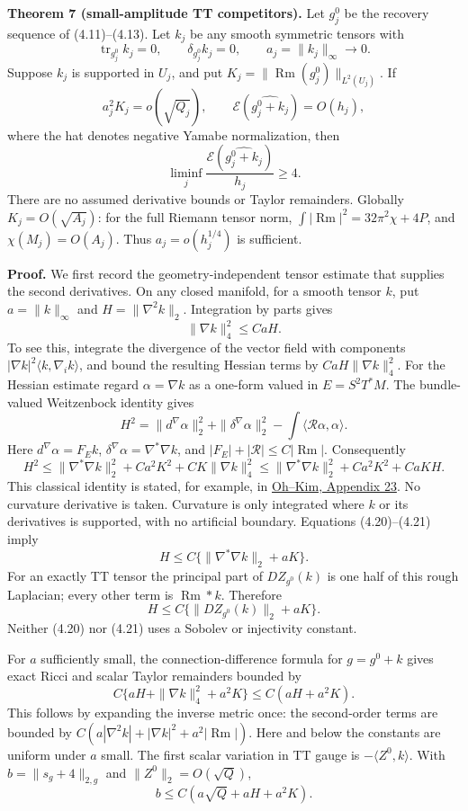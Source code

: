 \documentclass[
  10pt,
]{article}
\begin{document}
\textbf{Theorem 7 (small-amplitude TT competitors).} Let \(g_j^0\) be
the recovery sequence of (4.11)--(4.13). Let \(k_j\) be any smooth
symmetric tensors with \[
 \operatorname{tr}_{g_j^0}k_j=0,\qquad
 \delta_{g_j^0}k_j=0,\qquad a_j=\|k_j\|_\infty\longrightarrow0.
\] Suppose \(k_j\) is supported in \(U_j\), and put
\(K_j=\|\operatorname{Rm}(g_j^0)\|_{L^2(U_j)}\). If \[
 a_j^2 K_j=o(\sqrt{Q_j}),\qquad
 \mathcal E(\widehat{g_j^0+k_j})=O(h_j),
 \tag{4.18}
\] where the hat denotes negative Yamabe normalization, then \[
 \boxed{\liminf_j
     \frac{\mathcal E(\widehat{g_j^0+k_j})}{h_j}\ge4.} \tag{4.19}
\] There are no assumed derivative bounds or Taylor remainders. Globally
\(K_j=O(\sqrt{A_j})\): for the full Riemann tensor norm,
\(\int|\operatorname{Rm}|^2=32\pi^2\chi+4P\), and \(\chi(M_j)=O(A_j)\).
Thus \(a_j=o(h_j^{1/4})\) is sufficient.

\textbf{Proof.} We first record the geometry-independent tensor estimate
that supplies the second derivatives. On any closed manifold, for a
smooth tensor \(k\), put \(a=\|k\|_\infty\) and \(H=\|\nabla^2k\|_2\).
Integration by parts gives \[
 \|\nabla k\|_4^2\le CaH. \tag{4.20}
\] To see this, integrate the divergence of the vector field with
components \(|\nabla k|^2\langle k,\nabla_i k\rangle\), and bound the
resulting Hessian terms by \(CaH\|\nabla k\|_4^2\). For the Hessian
estimate regard \(\alpha=\nabla k\) as a one-form valued in
\(E=S^2T^*M\). The bundle-valued Weitzenbock identity gives \[
 H^2=\|d^\nabla\alpha\|_2^2+
        \|\delta^\nabla\alpha\|_2^2
                -\int\langle\mathcal R\alpha,\alpha\rangle.
\] Here \(d^\nabla\alpha=F_Ek\),
\(\delta^\nabla\alpha=\nabla^*\nabla k\), and
\(|F_E|+|\mathcal R|\le C|\operatorname{Rm}|\). Consequently \[
 H^2\le\|\nabla^*\nabla k\|_2^2+Ca^2K^2
            +CK\|\nabla k\|_4^2
       \le\|\nabla^*\nabla k\|_2^2+Ca^2K^2+CaKH.
 \tag{4.21}
\] This classical identity is stated, for example, in
\href{https://www.matrix-inst.org.au/wp_Matrix2016/wp-content/uploads/2023/07/OhKim.pdf}{Oh--Kim,
Appendix 23}. No curvature derivative is taken. Curvature is only
integrated where \(k\) or its derivatives is supported, with no
artificial boundary. Equations (4.20)--(4.21) imply \[
 H\le C\{\|\nabla^*\nabla k\|_2+aK\}.
\] For an exactly TT tensor the principal part of \(DZ_{g^0}(k)\) is one
half of this rough Laplacian; every other term is
\(\operatorname{Rm}*k\). Therefore \[
 H\le C\{\|DZ_{g^0}(k)\|_2+aK\}. \tag{4.22}
\] Neither (4.20) nor (4.21) uses a Sobolev or injectivity constant.

For \(a\) sufficiently small, the connection-difference formula for
\(g=g^0+k\) gives exact Ricci and scalar Taylor remainders bounded by \[
 C\{aH+\|\nabla k\|_4^2+a^2K\}
 \le C(aH+a^2K). \tag{4.23}
\] This follows by expanding the inverse metric once: the second-order
terms are bounded by
\(C(a|\nabla^2k|+|\nabla k|^2+a^2|\operatorname{Rm}|)\). Here and below
the constants are uniform under \(a\) small. The first scalar variation
in TT gauge is \(-\langle Z^0,k\rangle\). With \(b=\|s_g+4\|_{2,g}\) and
\(\|Z^0\|_2=O(\sqrt Q)\), \[
 b\le C(a\sqrt Q+aH+a^2K). \tag{4.24}
\]
\end{document}
